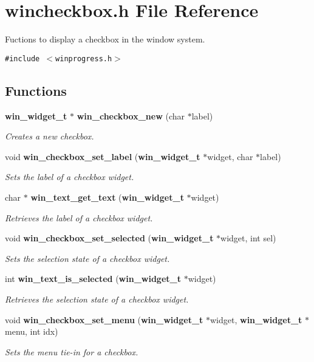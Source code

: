 \section{wincheckbox.h File Reference}
\label{wincheckbox_8h}
Fuctions to display a checkbox in the window system. 

{\tt \#include $<$winprogress.h$>$}\par
\subsection*{Functions}
\begin{CompactItemize}
\item 
{\bf win\_\-widget\_\-t} $\ast$ {\bf win\_\-checkbox\_\-new} (char $\ast$label)
\begin{CompactList}\small\item\em Creates a new checkbox. \item\end{CompactList}\item 
void {\bf win\_\-checkbox\_\-set\_\-label} ({\bf win\_\-widget\_\-t} $\ast$widget, char $\ast$label)
\begin{CompactList}\small\item\em Sets the label of a checkbox widget. \item\end{CompactList}\item 
char $\ast$ {\bf win\_\-text\_\-get\_\-text} ({\bf win\_\-widget\_\-t} $\ast$widget)
\begin{CompactList}\small\item\em Retrieves the label of a checkbox widget. \item\end{CompactList}\item 
void {\bf win\_\-checkbox\_\-set\_\-selected} ({\bf win\_\-widget\_\-t} $\ast$widget, int sel)
\begin{CompactList}\small\item\em Sets the selection state of a checkbox widget. \item\end{CompactList}\item 
int {\bf win\_\-text\_\-is\_\-selected} ({\bf win\_\-widget\_\-t} $\ast$widget)
\begin{CompactList}\small\item\em Retrieves the selection state of a checkbox widget. \item\end{CompactList}\item 
void {\bf win\_\-checkbox\_\-set\_\-menu} ({\bf win\_\-widget\_\-t} $\ast$widget, {\bf win\_\-widget\_\-t} $\ast$menu, int idx)
\begin{CompactList}\small\item\em Sets the menu tie-in for a checkbox. \item\end{CompactList}\end{CompactItemize}


